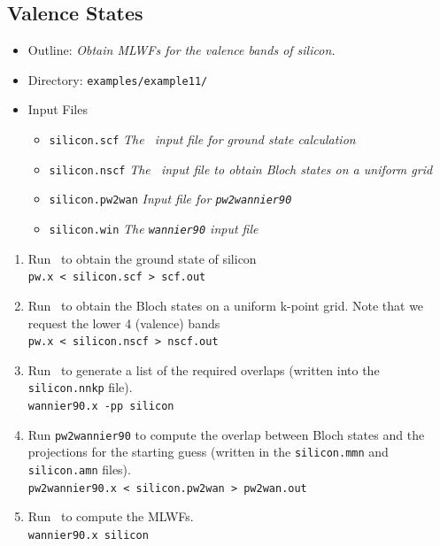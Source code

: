 \documentclass[a4paper,11pt,twoside]{article}
\begin{document}
\subsection*{Valence States}
\begin{itemize}
\item{Outline: \it{Obtain MLWFs for the valence bands of silicon.}}
\item{Directory: {\tt examples/example11/}}
\item{Input Files}
\begin{itemize}
\item{ {\tt silicon.scf}  {\it The \pwscf\ input file for ground state
    calculation}} 
\item{ {\tt silicon.nscf}  {\it The \pwscf\ input file to obtain Bloch
    states on a uniform grid}} 
\item{ {\tt silicon.pw2wan}  {\it Input file for {\tt pw2wannier90}}}
\item{ {\tt silicon.win}  {\it The {\tt wannier90} input file}}
\end{itemize}

\end{itemize}

\begin{enumerate}
\item Run \pwscf\ to obtain the ground state of silicon\\
{\tt pw.x < silicon.scf > scf.out}

\item Run \pwscf\ to obtain the Bloch states on a uniform k-point
  grid. Note that we request the lower 4 (valence) bands\\ 
{\tt pw.x < silicon.nscf > nscf.out}

\item Run \wannier\ to generate a list of the required overlaps (written
  into the {\tt silicon.nnkp} file).\\
{\tt wannier90.x -pp silicon}

\item Run {\tt pw2wannier90} to compute the overlap between Bloch
  states and the projections for the starting guess (written in the
  {\tt silicon.mmn} and {\tt  silicon.amn} files).\\
{\tt pw2wannier90.x < silicon.pw2wan > pw2wan.out}

\item Run \wannier\ to compute the MLWFs.\\
{\tt wannier90.x silicon}

\end{enumerate}
\end{document}
